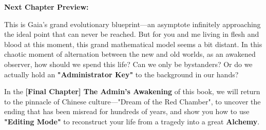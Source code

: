\textbf{Next Chapter Preview:}

This is Gaia's grand evolutionary blueprint—an asymptote infinitely approaching the ideal point that can never be reached.
But for you and me living in flesh and blood at this moment, this grand mathematical model seems a bit distant.
In this chaotic moment of alternation between the new and old worlds, as an awakened observer, how should we spend this life?
Can we only be bystanders? Or do we actually hold an \textbf{"Administrator Key"} to the background in our hands?

In the \textbf{[Final Chapter] The Admin's Awakening} of this book, we will return to the pinnacle of Chinese culture—"Dream of the Red Chamber", to uncover the ending that has been misread for hundreds of years, and show you how to use \textbf{"Editing Mode"} to reconstruct your life from a tragedy into a great \textbf{Alchemy}.

